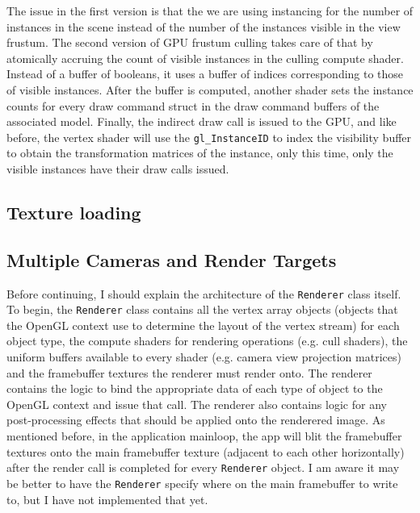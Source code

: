 \documentclass[letterpaper, 10 pt, conference]{ieeeconf}  %
\begin{document}
The issue in the first version is that the we are using instancing for the number of instances in the scene instead of the number of the instances visible in the view frustum. The second version of GPU frustum culling takes care of that by atomically accruing the count of visible instances in the culling compute shader. Instead of a buffer of booleans, it uses a buffer of indices corresponding to those of visible instances. After the buffer is computed, another shader sets the instance counts for every draw command struct in the draw command buffers of the associated model. Finally, the indirect draw call is issued to the GPU, and like before, the vertex shader will use the \texttt{gl\_InstanceID} to index the visibility buffer to obtain the transformation matrices of the instance, only this time, only the visible instances have their draw calls issued.


\subsection{Texture loading}

\subsection {Multiple Cameras and Render Targets}
Before continuing, I should explain the architecture of the \texttt{Renderer} class itself. To begin, the \texttt{Renderer} class contains all the vertex array objects (objects that the OpenGL context use to determine the layout of the vertex stream) for each object type, the compute shaders for rendering operations (e.g. cull shaders), the uniform buffers available to every shader (e.g. camera view projection matrices) and the framebuffer textures the renderer must render onto. The renderer contains the logic to bind the appropriate data of each type of object to the OpenGL context and issue that call. The renderer also contains logic for any post-processing effects that should be applied onto the renderered image. As mentioned before, in the application mainloop, the app will blit the framebuffer textures onto the main framebuffer texture (adjacent to each other horizontally) after the render call is completed for every \texttt{Renderer} object. I am aware it may be better to have the \texttt{Renderer} specify where on the main framebuffer to write to, but I have not implemented that yet. 
\end{document}
